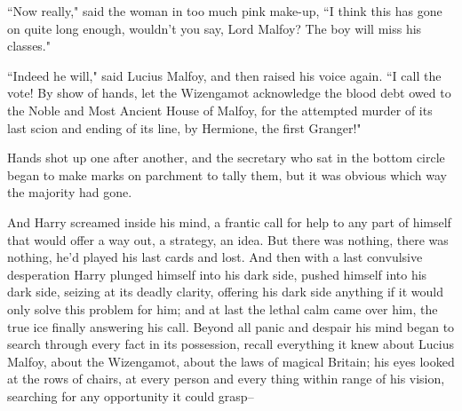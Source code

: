 ``Now really," said the woman in too much pink make-up, ``I think this has gone on quite long enough, wouldn't you say, Lord Malfoy? The boy will miss his classes."

``Indeed he will," said Lucius Malfoy, and then raised his voice again. ``I call the vote! By show of hands, let the Wizengamot acknowledge the blood debt owed to the Noble and Most Ancient House of Malfoy, for the attempted murder of its last scion and ending of its line, by Hermione, the first Granger!"

Hands shot up one after another, and the secretary who sat in the bottom circle began to make marks on parchment to tally them, but it was obvious which way the majority had gone.

And Harry screamed inside his mind, a frantic call for help to any part of himself that would offer a way out, a strategy, an idea. But there was nothing, there was nothing, he'd played his last cards and lost. And then with a last convulsive desperation Harry plunged himself into his dark side, pushed himself into his dark side, seizing at its deadly clarity, offering his dark side anything if it would only solve this problem for him; and at last the lethal calm came over him, the true ice finally answering his call. Beyond all panic and despair his mind began to search through every fact in its possession, recall everything it knew about Lucius Malfoy, about the Wizengamot, about the laws of magical Britain; his eyes looked at the rows of chairs, at every person and every thing within range of his vision, searching for any opportunity it could grasp\---

